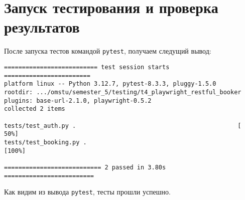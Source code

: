 \section{Запуск тестирования и проверка результатов}

После запуска тестов командой \texttt{pytest}, получаем следущий вывод:

\begin{verbatim}
========================== test session starts ========================
platform linux -- Python 3.12.7, pytest-8.3.3, pluggy-1.5.0
rootdir: .../omstu/semester_5/testing/t4_playwright_restful_booker
plugins: base-url-2.1.0, playwright-0.5.2
collected 2 items                                        

tests/test_auth.py .                                             [ 50%]
tests/test_booking.py .                                          [100%]

=========================== 2 passed in 3.80s =========================
\end{verbatim}

Как видим из вывода \texttt{pytest}, тесты прошли успешно.
